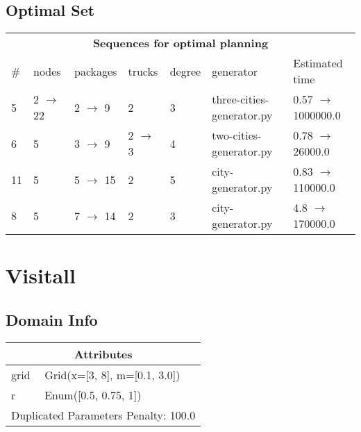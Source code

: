 \documentclass{article}
\begin{document}
                            \subsection*{Optimal Set}

                            \begin{center}
                            \begin{tabular}{l|l|l|l|l|l|l}
                            \multicolumn{7}{c}{\bf \large Sequences for optimal planning}\\
                            \# & nodes & packages & trucks & degree & generator & Estimated time\\\midrule
                            5&2 $\rightarrow$ 22&2 $\rightarrow$ 9&2&3&three-cities-generator.py&0.57 $\rightarrow$ 1000000.0\\
6&5&3 $\rightarrow$ 9&2 $\rightarrow$ 3&4&two-cities-generator.py&0.78 $\rightarrow$ 26000.0\\
11&5&5 $\rightarrow$ 15&2&5&city-generator.py&0.83 $\rightarrow$ 110000.0\\
8&5&7 $\rightarrow$ 14&2&3&city-generator.py&4.8 $\rightarrow$ 170000.0
                            \end{tabular}
                            \end{center}
                    \newpage \section{Visitall}
                    \subsection*{Domain Info}

                    \begin{center}
                    \begin{tabular}{p{}p{}}
                    \multicolumn{2}{c}{\bf \large Attributes}\\\midrule
                    grid & Grid(x=[3, 8], m=[0.1, 3.0])\\
r & Enum([0.5, 0.75, 1])
                    
                     \\\midrule
                    \multicolumn{2}{l}{Duplicated Parameters Penalty: 100.0}
                    \end{tabular}
                    \end{center}
                
\end{document}
